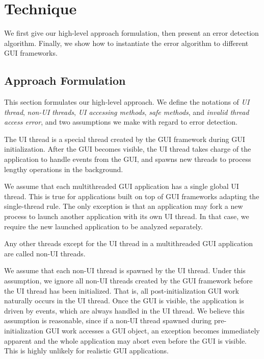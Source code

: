 \section{Technique}
\label{sec:technique}

We first give our high-level approach formulation, then present
an error detection algorithm. Finally, we show how to instantiate
the error algorithm to different GUI frameworks.


\subsection{Approach Formulation}

This section formulates our high-level approach. We define the
notations of \textit{UI thread}, \textit{non-UI threads},
\textit{UI accessing methods},
 \textit{safe methods}, and \textit{invalid thread access error}, and
two assumptions we make with regard to error detection.

 {The UI thread
is a special thread created by the GUI framework during
GUI initialization. After the GUI becomes visible, the UI thread
takes charge of the application to handle events from the GUI,
and spawns new threads to process lengthy operations in the background. }\vspace{1mm}

 {We assume that each multithreaded
GUI application has a single global UI thread. This is true for applications
built on top of GUI frameworks adapting the single-thread rule. The
only exception is that 
 an application may fork a new process to launch another
application with its own UI thread. In that case, we require the new
launched application to be analyzed separately.}\vspace{1mm}

 {Any other
threads except for the UI thread in a multithreaded GUI application
 are called non-UI threads.}\vspace{1mm}

 { We assume that each non-UI
thread is spawned by the UI thread. Under this assumption,
we ignore all non-UI threads created by the GUI framework
before the UI thread has been initialized. That is, all post-initialization
GUI work naturally occurs in the UI thread. Once the GUI is visible, the
application is driven by events, which are always handled in the UI thread.
We believe this assumption is reasonable, since if a non-UI thread 
spawned during pre-initialization GUI work accesses a GUI object, an exception becomes
immediately apparent and the whole application may abort even before the
GUI is visible. This is highly unlikely for realistic GUI
applications.
}\vspace{1mm}

